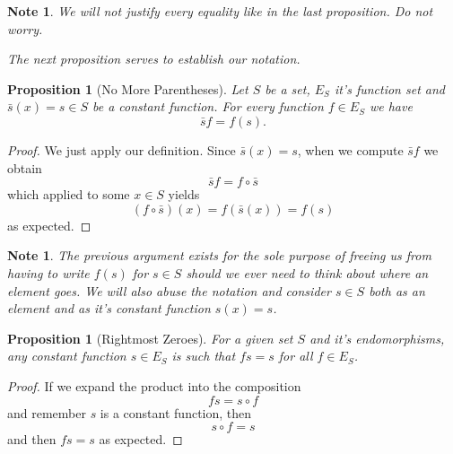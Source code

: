 \documentclass[11pt]{article}
\theoremstyle{plain}
\newtheorem{note}[definition]{Note}
\newtheorem{proposition}[definition]{Proposition}
\theoremstyle{nonumberplain}
\newtheorem{proof}[definition]{Proof}
\begin{document}
\begin{note}
    We will not justify every equality like in the last proposition. Do not worry.

    The next proposition serves to establish our notation.
\end{note}

\begin{proposition}[No More Parentheses]
    Let $S$ be a set, $E_S$ it's function set and $\bar s(x) = s \in S$ be a constant function. For every function $f \in E_S$ we have \begin{equation}
        \bar s f = f(s).
    \end{equation}
\end{proposition}

\begin{proof}
    We just apply our definition. Since $\bar s(x) = s$, when we compute $\bar s f$ we obtain \begin{equation}
        \bar s f = f \circ \bar s
    \end{equation}
    which applied to some $x \in S$ yields \begin{equation}
        (f \circ \bar s) (x) = f(\bar s (x)) = f(s)
    \end{equation}
    as expected.
\end{proof}

\begin{note}
    The previous argument exists for the sole purpose of freeing us from having to write $f(s)$ for $s \in S$ should we ever need to think about where an element goes. We will also abuse the notation and consider $s \in S$ both as an element and as it's constant function $s(x) = s$.
\end{note}

\begin{proposition}[Rightmost Zeroes]
    For a given set $S$ and it's endomorphisms, any constant function $s \in E_S$ is such that $fs = s$ for all $f \in E_S$.
\end{proposition}

\begin{proof}
    If we expand the product into the composition \begin{equation}
        fs = s \circ f
    \end{equation}
    and remember $s$ is a constant function, then \begin{equation}
        s \circ f = s 
    \end{equation}
    and then $fs = s$ as expected.
\end{proof}
\end{document}

